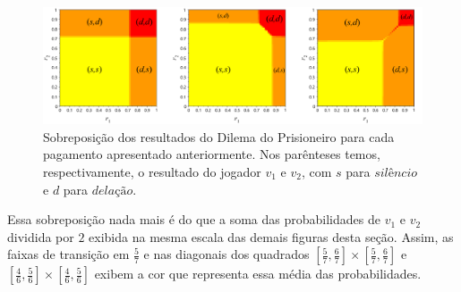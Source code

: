 \begin{figure}[h]
    \caption{Sobreposição dos resultados do Dilema do Prisioneiro para cada pagamento apresentado anteriormente. Nos parênteses temos, respectivamente, o resultado do jogador $v_1$ e $v_2$, com $s$ para $\textit{silêncio}$ e $d$ para $\textit{delação}$.}
    \centerline{\includegraphics[scale=0.0775]{./img/sobreposicao.png}}
    \label{fig:sobreposicao}
\end{figure}

Essa sobreposição nada mais é do que a soma das probabilidades de $v_1$ e $v_2$ dividida por $2$ exibida na mesma escala das demais figuras desta seção. Assim, as faixas de transição em $\frac{5}{7}$ e nas diagonais dos quadrados $[\frac{5}{7},\frac{6}{7}]\times[\frac{5}{7},\frac{6}{7}]$ e $[\frac{4}{6},\frac{5}{6}]\times[\frac{4}{6},\frac{5}{6}]$ exibem a cor que representa essa média das probabilidades.